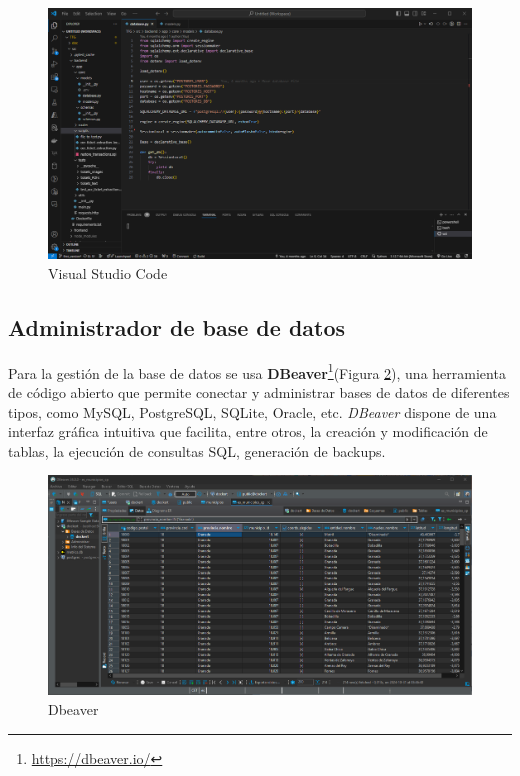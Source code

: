 \begin{figure}[ht!]
    \centering
    \includegraphics[width=\linewidth]{imagenes/visual_studio_code.png}
    \caption{Visual Studio Code}
    \label{fig:visual_studio_code}
\end{figure}

\subsection{Administrador de base de datos}
Para la gestión de la base de datos se usa \textbf{DBeaver}\footnote{\url{https://dbeaver.io/}}(Figura \ref{fig:dbeaver}), una herramienta de código abierto que permite conectar y administrar bases de datos de diferentes tipos, como MySQL, PostgreSQL, SQLite, Oracle, etc. \textit{DBeaver} dispone de una interfaz gráfica intuitiva que facilita, entre otros, la creación y modificación de tablas, la ejecución de consultas SQL, generación de backups.

\begin{figure}[ht!]
    \centering
    \includegraphics[width=\linewidth]{imagenes/dbeaver.png}
    \caption{Dbeaver}
    \label{fig:dbeaver}
\end{figure}

